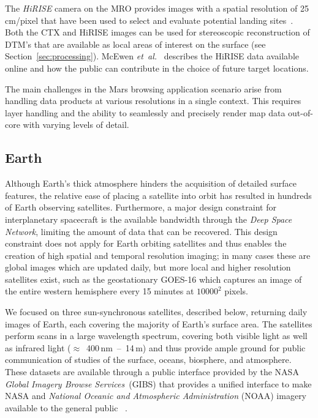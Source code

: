 \documentclass[journal]{vgtc}                %
\newcommand{\kallecomment}[1]{\textbf{[-Kalle-~}
    \textcolor{orange}{#1}
    \textbf{~]}}
\newcommand{\plgrem}[1]{\textcolor{blue}{~\textbf{!!}~}}
\newcommand{\etal}{\emph{et~al.}}
\begin{document}

The \emph{HiRISE} camera on the MRO provides images with a spatial resolution of 25\,cm/pixel that have been used to select and evaluate potential landing sites~\cite{mcewen2007mars}.
Both the CTX and HiRISE images can be used for stereoscopic reconstruction of DTM's that are available as local areas of interest on the surface (see Section~\ref{sec:processing}).
McEwen \etal~\cite{mcewen2016people} describes the HiRISE data available online and how the public can contribute in the choice of future target locations.

The main challenges in the Mars browsing application scenario arise from handling data products at various resolutions in a single context.
This requires layer handling and the ability to seamlessly and precisely render map data out-of-core with varying levels of detail.

\subsection{Earth} \label{sec:scenario:earth}
Although Earth's thick atmosphere hinders the acquisition of detailed surface features, the relative ease of placing a satellite into orbit has resulted in hundreds of Earth observing satellites.
Furthermore, a major design constraint for interplanetary spacecraft is the available bandwidth through the \emph{Deep Space Network}, limiting the amount of data that can be recovered.
This design constraint does not apply for Earth orbiting satellites and thus enables the creation of high spatial and temporal resolution imaging; in many cases these are global images which are updated daily, but more local and higher resolution satellites exist, such as the geostationary GOES-16 which captures an image of the entire western hemisphere every 15 minutes at $10000^2$ pixels.

We focused on three sun-synchronous satellites, described below, returning daily images of Earth, each covering the majority of Earth's surface area.
The satellites perform scans in a large wavelength spectrum, covering both visible light as well as infrared light ($\approx$~400\,nm~--~14\,\textmu m) and thus provide ample ground for public communication of studies of the surface, oceans, biosphere, and atmosphere.
These datasets are available through a public interface provided by the NASA \emph{Global Imagery Browse Services}~(GIBS) that provides a unified interface to make NASA and \emph{National Oceanic and Atmospheric Administration} (NOAA) imagery available to the general public ~\cite{cechini2013expanding}.
\end{document}
